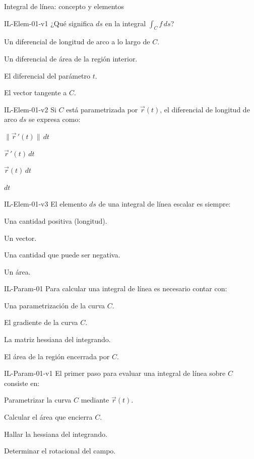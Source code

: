 \documentclass[a4,11pt]{aleph-notas}
\begin{document}
\begin{quiz}{Integral de línea: concepto y elementos}
\begin{multi}[]%
    {IL-Elem-01-v1}
    ¿Qué significa $ds$ en la integral $\displaystyle\int_C f\,ds$?
    \item* Un diferencial de longitud de arco a lo largo de $C$.
    \item Un diferencial de área de la región interior.
    \item El diferencial del parámetro $t$.
    \item El vector tangente a $C$.
\end{multi}

\begin{multi}[]%
    {IL-Elem-01-v2}
    Si $C$ está parametrizada por $\vec{r}(t)$, el diferencial de longitud de arco $ds$ se expresa como:
    \item* $\|\vec{r}\,'(t)\|\,dt$
    \item $\vec{r}\,'(t)\,dt$
    \item $\vec{r}(t)\,dt$
    \item $dt$
\end{multi}

\begin{multi}[]%
    {IL-Elem-01-v3}
    El elemento $ds$ de una integral de línea escalar es siempre:
    \item* Una cantidad positiva (longitud).
    \item Un vector.
    \item Una cantidad que puede ser negativa.
    \item Un área.
\end{multi}

\begin{multi}[]%
    {IL-Param-01}
    Para calcular una integral de línea es necesario contar con:
    \item* Una parametrización de la curva $C$.
    \item El gradiente de la curva $C$.
    \item La matriz hessiana del integrando.
    \item El área de la región encerrada por $C$.
\end{multi}

\begin{multi}[]%
    {IL-Param-01-v1}
    El primer paso para evaluar una integral de línea sobre $C$ consiste en:
    \item* Parametrizar la curva $C$ mediante $\vec{r}(t)$.
    \item Calcular el área que encierra $C$.
    \item Hallar la hessiana del integrando.
    \item Determinar el rotacional del campo.
\end{multi}


\end{quiz}
\end{document}
